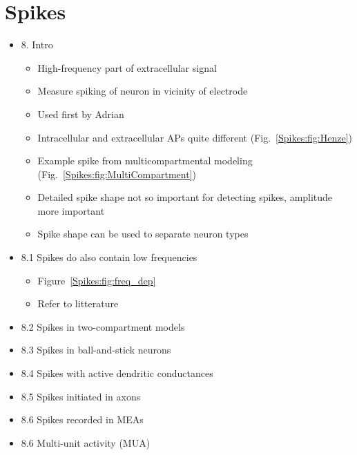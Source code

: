 \chapter{Spikes}
\label{sec:Spikes}

\begin{itemize}
\item 8. Intro
\begin{itemize}
\item High-frequency part of extracellular signal
\item Measure spiking of neuron in vicinity of electrode
\item Used first by Adrian
\item Intracellular and extracellular APs quite different (Fig.~\ref{Spikes:fig:Henze})
\item Example spike from multicompartmental modeling (Fig.~\ref{Spikes:fig:MultiCompartment})
\item Detailed spike shape not so important for detecting spikes, amplitude more important
\item Spike shape can be used to separate neuron types    
\end{itemize}
\item 8.1  Spikes do also contain low frequencies
\begin{itemize}
\item Figure~\ref{Spikes:fig:freq_dep}
\item Refer to litterature
\end{itemize}
\item 8.2 Spikes in two-compartment models
\item 8.3 Spikes in ball-and-stick neurons
\item 8.4 Spikes with active dendritic conductances
\item 8.5 Spikes initiated in axons
\item 8.6 Spikes recorded in MEAs
\item 8.6 Multi-unit activity (MUA)
\end{itemize} 

